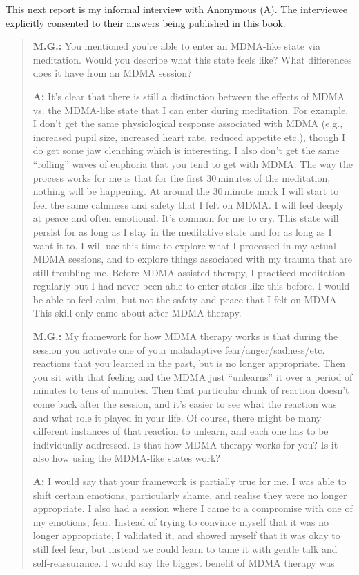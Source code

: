\documentclass[11pt,oneside]{book}
\begin{document}
This next report is my informal interview with Anonymous (A). The interviewee explicitly consented to their answers being published in this book.
\begin{quotation}
    \textbf{M.G.:} You mentioned you're able to enter an MDMA-like state via meditation. Would you describe what this state feels like? What differences does it have from an MDMA session?

    \textbf{A:} It's clear that there is still a distinction between the effects of MDMA vs. the MDMA-like state that I can enter during meditation. For example, I don't get the same physiological response associated with MDMA (e.g., increased pupil size, increased heart rate, reduced appetite etc.), though I do get some jaw clenching which is interesting. I also don't get the same \enquote{rolling} waves of euphoria that you tend to get with MDMA. The way the process works for me is that for the first 30\,minutes of the meditation, nothing will be happening. At around the 30\,minute mark I will start to feel the same calmness and safety that I felt on MDMA. I will feel deeply at peace and often emotional. It's common for me to cry. This state will persist for as long as I stay in the meditative state and for as long as I want it to. I will use this time to explore what I processed in my actual MDMA sessions, and to explore things associated with my trauma that are still troubling me. Before MDMA-assisted therapy, I practiced meditation regularly but I had never been able to enter states like this before. I would be able to feel calm, but not the safety and peace that I felt on MDMA. This skill only came about after MDMA therapy.

    \vspace{\baselineskip}

    \textbf{M.G.:} My framework for how MDMA therapy works is that during the session you activate one of your maladaptive fear/anger/sadness/etc. reactions that you learned in the past, but is no longer appropriate. Then you sit with that feeling and the MDMA just \enquote{unlearns} it over a period of minutes to tens of minutes. Then that particular chunk of reaction doesn't come back after the session, and it's easier to see what the reaction was and what role it played in your life. Of course, there might be many different instances of that reaction to unlearn, and each one has to be individually addressed. Is that how MDMA therapy works for you? Is it also how using the MDMA-like states work?

    \textbf{A:} I would say that your framework is partially true for me. I was able to shift certain emotions, particularly shame, and realise they were no longer appropriate. I also had a session where I came to a compromise with one of my emotions, fear. Instead of trying to convince myself that it was no longer appropriate, I validated it, and showed myself that it was okay to still feel fear, but instead we could learn to tame it with gentle talk and self-reassurance. I would say the biggest benefit of MDMA therapy was


\end{quotation}
\end{document}
